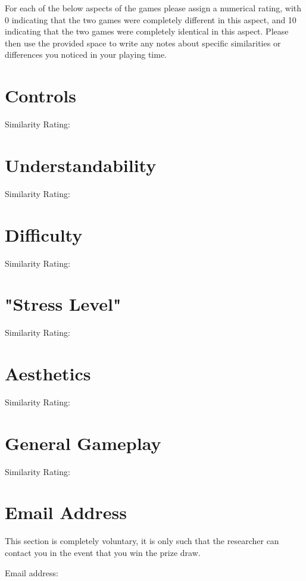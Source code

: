 \documentclass[12pt, a4paper]{report}
\begin{document}
For each of the below aspects of the games please assign a numerical rating, with 0 indicating that the two games were completely different in this aspect, and 10 indicating that the two games were completely identical in this aspect.
Please then use the provided space to write any notes about specific similarities or differences you noticed in your playing time.

\section*{Controls}

Similarity Rating: \makebox[3cm]{\hrulefill}

\vspace{10cm}

\section*{Understandability}

Similarity Rating: \makebox[3cm]{\hrulefill}

\vspace{10cm}

\section*{Difficulty}

Similarity Rating: \makebox[3cm]{\hrulefill}

\vspace{10cm}

\section*{"Stress Level"}

Similarity Rating: \makebox[3cm]{\hrulefill}

\vspace{10cm}

\section*{Aesthetics}

Similarity Rating: \makebox[3cm]{\hrulefill}

\vspace{10cm}

\section*{General Gameplay}

Similarity Rating: \makebox[3cm]{\hrulefill}

\vspace{10cm}

\section*{Email Address}

This section is completely voluntary, it is only such that the researcher can contact you in the event that you win the prize draw.

\par

Email address: \makebox[10cm]{\hrulefill}
\end{document}
